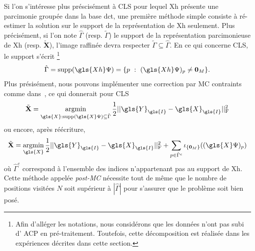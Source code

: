 Si l'on s'intéresse plus préscisément à CLS pour lequel \gls{Xh} présente une parcimonie groupée dans la base \gls{dct}, une première méthode simple consiste à ré-estimer la solution sur le support de la représentation de \gls{Xh} seulement.
Plus précisément, si l'on note $\hat{\Gamma}$ (resp. $\tilde{\Gamma}$) le support de la représentation parcimonieuse de \gls{Xh} (resp. $\tilde{\mathbf{X}}$), l'image raffinée devra respecter $\tilde{\Gamma} \subseteq \hat{\Gamma}$. En ce qui concerne CLS, le support s'écrit%
%
\footnote{Afin d'alléger les notations, nous considérons que les données n'ont pas subi d' ACP en pré-traitement. Toutefois, cette décomposition est réalisée dans les expériences décrites dans cette section.}
%
\begin{equation}
    \hat{\Gamma} = \mathrm{supp}(\gls{Xh}\Psi)  = \{p\ :\ (\gls{Xh}\Psi)_p \neq \mathbf{0}_M \}.
\end{equation}
Plus présisément, nous pouvons implémenter une correction par MC contraints comme dans~\cite{belloni2013least}, ce qui donnerait pour CLS
\begin{equation}
    \tilde{\mathbf{X}} = \argmin_{\gls{X} : \mathrm{supp}(\gls{X}\Psi)\subseteq\hat{\Gamma}} 
    \frac{1}{2}\frobnorm{\gls{Y}_{\gls{I}} - \gls{X}_{\gls{I}}}
\end{equation}
ou encore, après réécriture,
\begin{equation}\label{eq-refining-simple}
    \tilde{\mathbf{X}} = \argmin_{\gls{X}} 
    \frac{1}{2}\frobnorm{\gls{Y}_{\gls{I}} - \gls{X}_{\gls{I}}} + 
    \sum_{p\in\hat{\Gamma}^c} \iota_{\{\mathbf{0}_M\}}((\gls{X}\Psi)_p)
\end{equation}
où $\hat{\Gamma}^c$ correspond à l'ensemble des indices n'appartenant pas au support de \gls{Xh}. Cette méthode appelée \emph{post-MC} nécessite tout de même que le nombre de positions visitées $N$ soit supérieur à $|\hat{\Gamma}|$ pour s'assurer que le problème soit bien posé.

